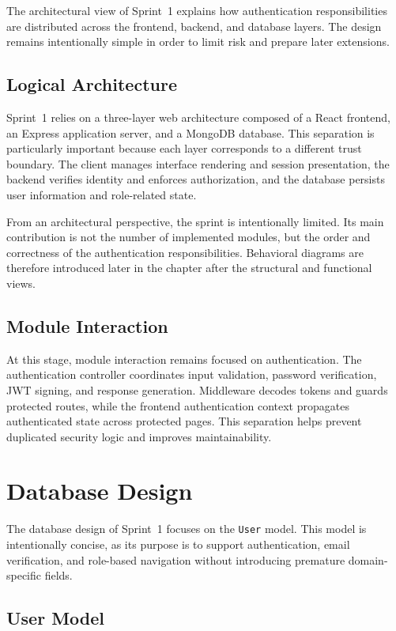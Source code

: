 \documentclass[a4paper,12pt]{report}
\begin{document}
The architectural view of Sprint~1 explains how authentication responsibilities are distributed across the frontend, backend, and database layers. The design remains intentionally simple in order to limit risk and prepare later extensions.

\subsection{Logical Architecture}

Sprint~1 relies on a three-layer web architecture composed of a React frontend, an Express application server, and a MongoDB database. This separation is particularly important because each layer corresponds to a different trust boundary. The client manages interface rendering and session presentation, the backend verifies identity and enforces authorization, and the database persists user information and role-related state.

From an architectural perspective, the sprint is intentionally limited. Its main contribution is not the number of implemented modules, but the order and correctness of the authentication responsibilities. Behavioral diagrams are therefore introduced later in the chapter after the structural and functional views.

\subsection{Module Interaction}

At this stage, module interaction remains focused on authentication. The authentication controller coordinates input validation, password verification, JWT signing, and response generation. Middleware decodes tokens and guards protected routes, while the frontend authentication context propagates authenticated state across protected pages. This separation helps prevent duplicated security logic and improves maintainability.

\section{Database Design}
\label{sec:sprint1-database}

The database design of Sprint~1 focuses on the \texttt{User} model. This model is intentionally concise, as its purpose is to support authentication, email verification, and role-based navigation without introducing premature domain-specific fields.

\subsection{User Model}
\end{document}

